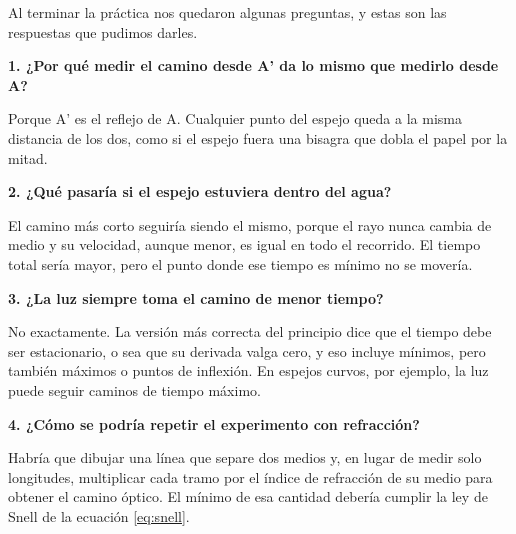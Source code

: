 Al terminar la práctica nos quedaron algunas preguntas, y estas son las respuestas que pudimos darles.

\textbf{1. ¿Por qué medir el camino desde A' da lo mismo que medirlo desde A?}

Porque A' es el reflejo de A. Cualquier punto del espejo queda a la misma distancia de los dos, como si el espejo fuera una bisagra que dobla el papel por la mitad.

\textbf{2. ¿Qué pasaría si el espejo estuviera dentro del agua?}

El camino más corto seguiría siendo el mismo, porque el rayo nunca cambia de medio y su velocidad, aunque menor, es igual en todo el recorrido. El tiempo total sería mayor, pero el punto donde ese tiempo es mínimo no se movería.

\textbf{3. ¿La luz siempre toma el camino de menor tiempo?}

No exactamente. La versión más correcta del principio dice que el tiempo debe ser estacionario, o sea que su derivada valga cero, y eso incluye mínimos, pero también máximos o puntos de inflexión. En espejos curvos, por ejemplo, la luz puede seguir caminos de tiempo máximo.

\textbf{4. ¿Cómo se podría repetir el experimento con refracción?}

Habría que dibujar una línea que separe dos medios y, en lugar de medir solo longitudes, multiplicar cada tramo por el índice de refracción de su medio para obtener el camino óptico. El mínimo de esa cantidad debería cumplir la ley de Snell de la ecuación \eqref{eq:snell}.
